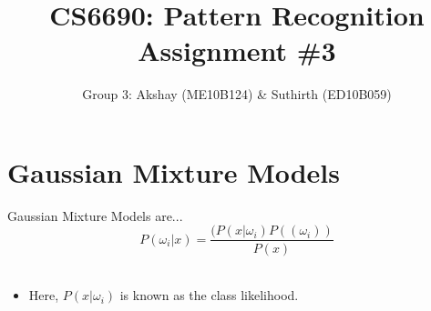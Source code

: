 \documentclass[11pt,a4paper]{article}
\begin{document}
\title{CS6690: Pattern Recognition Assignment \#3}
\author{Group 3: Akshay (ME10B124) \& Suthirth (ED10B059)}
\maketitle

\newpage

\section{Gaussian Mixture Models}
Gaussian Mixture Models are...
\begin{equation}
P(\omega_i | x) = \frac{(P(x|\omega_i)P((\omega_i))}{P(x)}
\end{equation}
\\ 

\begin{itemize}

	\item Here, $P(x|\omega_i)$ is known as the class likelihood. 

\end{itemize}
\end{document}
